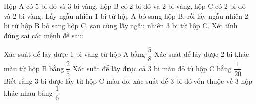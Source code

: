  \begin{ex}%
  Hộp A có 5 bi đỏ và 3 bi vàng, hộp B có 2 bi đỏ và 2 bi vàng, hộp C có 2 bi đỏ và 2 bi vàng. Lấy ngẫu nhiên 1 bi từ hộp A bỏ sang hộp B, rồi lấy ngẫu nhiên 2 bi từ hộp B bỏ sang hộp C, sau cùng lấy ngẫu nhiên 3 bi từ hộp C.
 Xét tính đúng sai các mệnh đề sau: 

 \choiceTF
 {Xác suất để lấy được 1 bi vàng từ hộp A bằng $\dfrac{5}{8}$}
 {Xác suất để lấy được 2 bi khác màu từ hộp B bằng $\dfrac{2}{5}$}
 {Xác suất để lấy được cả 3 bi màu đỏ từ hộp C bằng $\dfrac{1}{20}$}
 {\True Biết rằng 3 bi được lấy từ hộp C màu đỏ, xác suất để 3 bi đó vốn thuộc về 3 hộp khác nhau bằng $\dfrac{1}{6}$}
 \end{ex}
%
